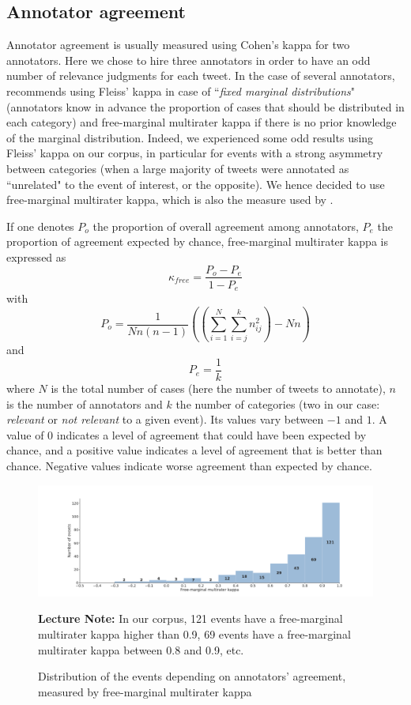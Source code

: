 	\subsection{Annotator agreement}

Annotator agreement is usually measured using Cohen's kappa for two annotators. Here we chose to hire three annotators in order to have an odd number of relevance judgments for each tweet. In the case of several annotators, \citet{randolph_free_2005} recommends using Fleiss' kappa \citep{fleiss_measuring_1971} in case of ``\textit{fixed marginal distributions}" (annotators know in advance the proportion of cases that should be distributed in each category) and free-marginal multirater kappa \citep{randolph_free_2005} if there is no prior knowledge of the marginal distribution. Indeed, we experienced some odd results using Fleiss' kappa on our corpus, in particular for events with a strong asymmetry between categories (when a large majority of tweets were annotated as ``unrelated" to the event of interest, or the opposite). We hence decided to use free-marginal multirater kappa, which is also the measure used by \citet{mcminn_building_2013}.


If one denotes $P_o$ the proportion of overall agreement among annotators, $P_e$ the proportion of agreement expected by chance, free-marginal multirater kappa is expressed as 
$$
\kappa_{free} = \frac{P_o - P_e}{1 - P_e}
$$
with 
$$
P_o = \frac{1}{Nn(n-1)}((\sum_{i=1}^N\sum_{i=j}^kn_{ij}^2)-Nn)
$$
and
$$
P_e = \frac{1}{k}
$$
where $N$ is the total number of cases (here the number of tweets to annotate), $n$ is the number of annotators and $k$ the number of categories (two in our case: \textit{relevant} or \textit{not relevant} to a given event). Its values vary between $-1$ and $1$. A value of $0$ indicates a level of agreement that could have been expected by chance, and a positive value indicates a level of agreement that is better than chance. Negative values indicate worse agreement than expected by chance.


\begin{figure}
\begin{center}
\includegraphics[width=1\textwidth]{figures/HistogramEventsDistributionByKappa.pdf}
\end{center}
{\scriptsize \textbf{Lecture Note:} In our corpus, 121 events have a free-marginal multirater kappa higher than 0.9, 69 events have a free-marginal multirater kappa between 0.8 and 0.9, etc.
}
\caption{Distribution of the events depending on annotators' agreement, measured by free-marginal multirater kappa}
\label{Figure:HistogramEventsByKappa}
\end{figure}

